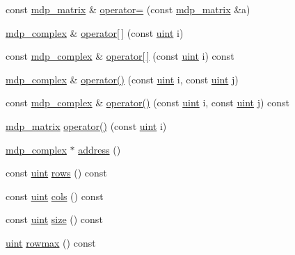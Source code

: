 \begin{DoxyCompactItemize}
const \hyperlink{classmdp__matrix}{mdp\+\_\+matrix} \& \hyperlink{classmdp__matrix_a5746a4a6feeaca44c8c9a02bd21e9d57}{operator=} (const \hyperlink{classmdp__matrix}{mdp\+\_\+matrix} \&a)
\item 
\hyperlink{classmdp__complex}{mdp\+\_\+complex} \& \hyperlink{classmdp__matrix_af6008a99ddef98e8bbd072f624206a18}{operator\mbox{[}$\,$\mbox{]}} (const \hyperlink{mdp__global__vars_8h_a91ad9478d81a7aaf2593e8d9c3d06a14}{uint} i)
\item 
const \hyperlink{classmdp__complex}{mdp\+\_\+complex} \& \hyperlink{classmdp__matrix_af06d6f34cd2f07e89e2d5a6a0c02d478}{operator\mbox{[}$\,$\mbox{]}} (const \hyperlink{mdp__global__vars_8h_a91ad9478d81a7aaf2593e8d9c3d06a14}{uint} i) const
\item 
\hyperlink{classmdp__complex}{mdp\+\_\+complex} \& \hyperlink{classmdp__matrix_a820c578eaf97324bec338827db42b8e6}{operator()} (const \hyperlink{mdp__global__vars_8h_a91ad9478d81a7aaf2593e8d9c3d06a14}{uint} i, const \hyperlink{mdp__global__vars_8h_a91ad9478d81a7aaf2593e8d9c3d06a14}{uint} j)
\item 
const \hyperlink{classmdp__complex}{mdp\+\_\+complex} \& \hyperlink{classmdp__matrix_a0366837f0e176d30b42a7103da996b4e}{operator()} (const \hyperlink{mdp__global__vars_8h_a91ad9478d81a7aaf2593e8d9c3d06a14}{uint} i, const \hyperlink{mdp__global__vars_8h_a91ad9478d81a7aaf2593e8d9c3d06a14}{uint} j) const
\item 
\hyperlink{classmdp__matrix}{mdp\+\_\+matrix} \hyperlink{classmdp__matrix_aef809061e550a0587af45e098810c95e}{operator()} (const \hyperlink{mdp__global__vars_8h_a91ad9478d81a7aaf2593e8d9c3d06a14}{uint} i)
\item 
\hyperlink{classmdp__complex}{mdp\+\_\+complex} $\ast$ \hyperlink{classmdp__matrix_a557c3deb958c09b99f045df8d41a506e}{address} ()
\item 
const \hyperlink{mdp__global__vars_8h_a91ad9478d81a7aaf2593e8d9c3d06a14}{uint} \hyperlink{classmdp__matrix_a1bdb30897895b498949c39255ff14c28}{rows} () const
\item 
const \hyperlink{mdp__global__vars_8h_a91ad9478d81a7aaf2593e8d9c3d06a14}{uint} \hyperlink{classmdp__matrix_abcecb90b0b780b17c9669a1dce59a101}{cols} () const
\item 
const \hyperlink{mdp__global__vars_8h_a91ad9478d81a7aaf2593e8d9c3d06a14}{uint} \hyperlink{classmdp__matrix_afa317ffe0112321496fac79cc81d0d07}{size} () const
\item 
\hyperlink{mdp__global__vars_8h_a91ad9478d81a7aaf2593e8d9c3d06a14}{uint} \hyperlink{classmdp__matrix_a224a84e082fe093083f1887ed9bc185e}{rowmax} () const

\end{DoxyCompactItemize}

